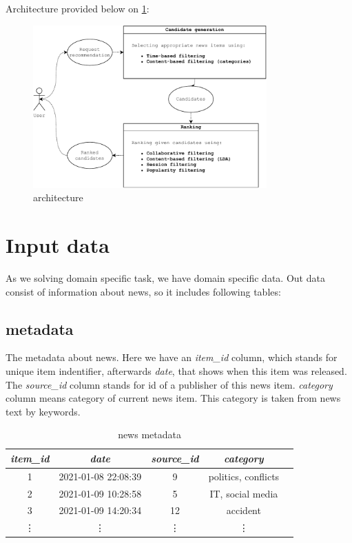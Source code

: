 \documentclass{article}
\begin{document}
Architecture provided below on \cref{fig:architecture}:

\begin{figure}[h]
    \centering
    \includegraphics[width=0.8\textwidth]{./images/architechture.pdf}
    \caption{architecture}
    \label{fig:architecture}
\end{figure}

\section{Input data}
\label{sec:input}

As we solving domain specific task, we have domain specific data.
Out data consist of information about news, so it includes following tables:

\subsection*{metadata}

The metadata about news. Here we have an \textit{item\_id} column, which stands for unique item indentifier, afterwards \textit{date}, that shows when this item was released. The \textit{source\_id} column stands for id of a publisher of this news item. \textit{category} column means category of current news item. This category is taken from news text by keywords.

\begin{table}[h]
    \centering
    \begin{tabular}{ccccc}
        \toprule

        \emph{item\_id} & \emph{date} & \emph{source\_id} & \emph{category}\\\midrule

        1 & 2021-01-08 22:08:39 & 9  & politics, conflicts\\
        2 & 2021-01-09 10:28:58 & 5  & IT, social media\\
        3 & 2021-01-09 14:20:34 & 12 & accident\\
        \vdots & \vdots & \vdots & \vdots \\\bottomrule
    \end{tabular}

    \caption{news metadata}
    \label{tab:meta}
\end{table}
\end{document}
